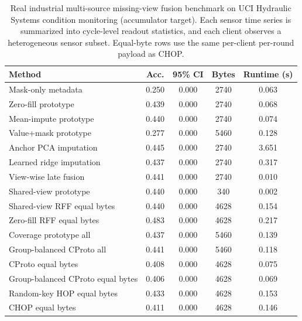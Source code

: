 \begin{table}[t]
\centering
\caption{Real industrial multi-source missing-view fusion benchmark on UCI Hydraulic Systems condition monitoring (accumulator target). Each sensor time series is summarized into cycle-level readout statistics, and each client observes a heterogeneous sensor subset. Equal-byte rows use the same per-client per-round payload as CHOP.}
\label{tab:if-hydraulic-fusion}
\scriptsize
\setlength{\tabcolsep}{3pt}
\renewcommand{\arraystretch}{0.94}
\begin{tabular}{lcccc}
\toprule
Method & Acc. & 95\% CI & Bytes & Runtime (s) \\
\midrule
Mask-only metadata & 0.250 & 0.000 & 2740 & 0.063 \\
Zero-fill prototype & 0.439 & 0.000 & 2740 & 0.068 \\
Mean-impute prototype & 0.440 & 0.000 & 2740 & 0.074 \\
Value+mask prototype & 0.277 & 0.000 & 5460 & 0.128 \\
Anchor PCA imputation & 0.445 & 0.000 & 2740 & 3.651 \\
Learned ridge imputation & 0.437 & 0.000 & 2740 & 0.317 \\
View-wise late fusion & 0.441 & 0.000 & 2740 & 0.010 \\
Shared-view prototype & 0.440 & 0.000 & 340 & 0.002 \\
Shared-view RFF equal bytes & 0.440 & 0.000 & 4628 & 0.154 \\
Zero-fill RFF equal bytes & 0.483 & 0.000 & 4628 & 0.217 \\
Coverage prototype all & 0.437 & 0.000 & 5460 & 0.139 \\
Group-balanced CProto all & 0.441 & 0.000 & 5460 & 0.118 \\
CProto equal bytes & 0.408 & 0.000 & 4628 & 0.075 \\
Group-balanced CProto equal bytes & 0.406 & 0.000 & 4628 & 0.069 \\
Random-key HOP equal bytes & 0.433 & 0.000 & 4628 & 0.153 \\
CHOP equal bytes & 0.411 & 0.000 & 4628 & 0.146 \\
\bottomrule
\end{tabular}
\end{table}
